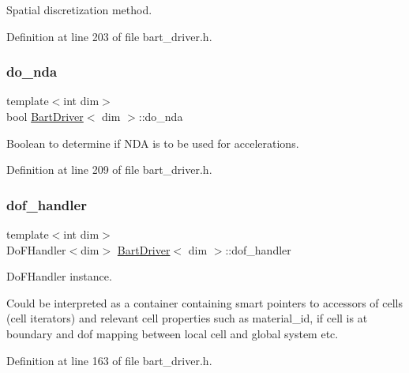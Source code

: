 Spatial discretization method. 



Definition at line 203 of file bart\+\_\+driver.\+h.

\mbox{\label{class_bart_driver_acb7aa4c65a18deef5e1be7a3477d1b12}} 
\subsubsection{\texorpdfstring{do\+\_\+nda}{do\_nda}}
{\footnotesize\ttfamily template$<$int dim$>$ \\
bool \hyperlink{class_bart_driver}{Bart\+Driver}$<$ dim $>$\+::do\+\_\+nda\hspace{0.3cm}{\ttfamily [private]}}



Boolean to determine if N\+DA is to be used for accelerations. 



Definition at line 209 of file bart\+\_\+driver.\+h.

\mbox{\label{class_bart_driver_a102ccb2fc2ea225bc75f757214152c1b}} 
\subsubsection{\texorpdfstring{dof\+\_\+handler}{dof\_handler}}
{\footnotesize\ttfamily template$<$int dim$>$ \\
Do\+F\+Handler$<$dim$>$ \hyperlink{class_bart_driver}{Bart\+Driver}$<$ dim $>$\+::dof\+\_\+handler\hspace{0.3cm}{\ttfamily [private]}}



Do\+F\+Handler instance. 

Could be interpreted as a container containing smart pointers to accessors of cells (cell iterators) and relevant cell properties such as material\+\_\+id, if cell is at boundary and dof mapping between local cell and global system etc. 

Definition at line 163 of file bart\+\_\+driver.\+h.

\mbox{\label{class_bart_driver_a90adc0f013f07a10c5d423e3506bd589}} 
